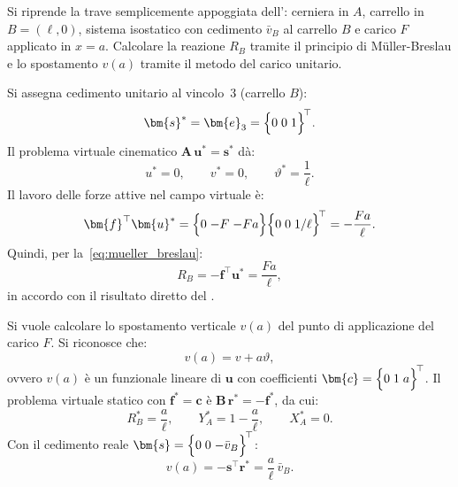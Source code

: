 \begin{esempio}
	\label{ex:trave_semplice_PLV}
	Si riprende la trave semplicemente appoggiata
	dell': cerniera in $A$,
	carrello in $B = (\ell, 0)$, sistema isostatico con
	cedimento $\bar{v}_B$ al carrello $B$ e carico $F$
	applicato in $x = a$. Calcolare la reazione $R_B$
	tramite il principio di Müller-Breslau e lo spostamento
	$v(a)$ tramite il metodo del carico unitario.


\begin{svolgimento}
	
	Si assegna cedimento unitario al vincolo~3
	(carrello $B$):
	\begin{equation*}
		\bm{s}^* = \bm{e}_3 =
		\Bigl\{0\; 0\; 1\Bigr\}^{\!\top}.
	\end{equation*}
	Il problema virtuale cinematico
	$\bm{A}\,\bm{u}^* = \bm{s}^*$ dà:
	\begin{equation*}
		u^* = 0, \qquad v^* = 0, \qquad
		\vartheta^* = \frac{1}{\ell}.
	\end{equation*}
	Il lavoro delle forze attive nel campo virtuale è:
	\begin{equation*}
		\bm{f}^{\top}\bm{u}^* =
		\Bigl\{0\; {-F}\; {-Fa}\Bigr\}
		\Bigl\{0\; 0\; 1/\ell\Bigr\}^{\!\top}
		= -\frac{Fa}{\ell}.
	\end{equation*}
	Quindi, per la~\eqref{eq:mueller_breslau}:
	\begin{equation*}
		R_B = -\bm{f}^{\top}\bm{u}^* = \frac{Fa}{\ell},
	\end{equation*}
	in accordo con il risultato diretto del
	.
	
	Si vuole calcolare lo spostamento verticale $v(a)$
	del punto di applicazione del carico $F$. Si riconosce
	che:
	\begin{equation*}
		v(a) = v + a\vartheta,
	\end{equation*}
	ovvero $v(a)$ è un funzionale lineare di $\bm{u}$ con
	coefficienti $\bm{c} = \Bigl\{0\; 1\; a\Bigr\}^{\!\top}$.
	Il problema virtuale statico con $\bm{f}^* = \bm{c}$
	è $\bm{B}\,\bm{r}^* = -\bm{f}^*$, da cui:
	\begin{equation*}
		R_B^* = \frac{a}{\ell}, \qquad
		Y_A^* = 1 - \frac{a}{\ell}, \qquad
		X_A^* = 0.
	\end{equation*}
	Con il cedimento reale
	$\bm{s} = \Bigl\{0\; 0\; {-\bar{v}_B}\Bigr\}^{\!\top}$:
	\begin{equation*}
		v(a) = -\bm{s}^{\top}\bm{r}^* =
		\frac{a}{\ell}\,\bar{v}_B.
	\end{equation*}
	

\end{svolgimento}
\end{esempio}

